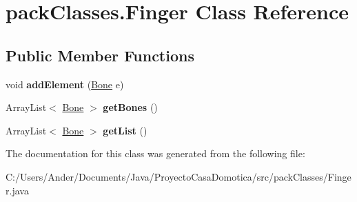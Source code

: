 \hypertarget{classpack_classes_1_1_finger}{}\section{pack\+Classes.\+Finger Class Reference}
\label{classpack_classes_1_1_finger}
\subsection*{Public Member Functions}
\begin{DoxyCompactItemize}
\item 
\mbox{\label{classpack_classes_1_1_finger_a99a982d6c6908fe5aed6a58cead7f2b0}} 
void {\bfseries add\+Element} (\mbox{\hyperlink{classpack_classes_1_1_bone}{Bone}} e)
\item 
\mbox{\label{classpack_classes_1_1_finger_ab5d153c2d94417280430f0ee6025b1bf}} 
Array\+List$<$ \mbox{\hyperlink{classpack_classes_1_1_bone}{Bone}} $>$ {\bfseries get\+Bones} ()
\item 
\mbox{\label{classpack_classes_1_1_finger_a80ea0752803fbf7c423acc124fc5770d}} 
Array\+List$<$ \mbox{\hyperlink{classpack_classes_1_1_bone}{Bone}} $>$ {\bfseries get\+List} ()
\end{DoxyCompactItemize}


The documentation for this class was generated from the following file\+:\begin{DoxyCompactItemize}
\item 
C\+:/\+Users/\+Ander/\+Documents/\+Java/\+Proyecto\+Casa\+Domotica/src/pack\+Classes/Finger.\+java\end{DoxyCompactItemize}
